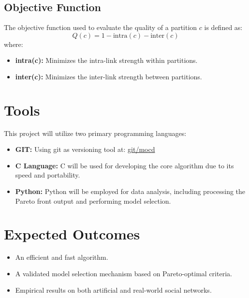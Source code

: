 \documentclass{article}
\begin{document}
\subsection{Objective Function}
The objective function used to evaluate the quality of a partition \( c \) is defined as:
\[
Q(c) = 1 - \text{intra}(c) - \text{inter}(c)
\]
where:
\begin{itemize}
    \item \textbf{intra(c):} Minimizes the intra-link strength within partitions.
    \item \textbf{inter(c):} Minimizes the inter-link strength between partitions.
\end{itemize}

\section{Tools}
This project will utilize two primary programming languages:

\begin{itemize}
    \item \textbf{GIT:} Using git as versioning tool at: \href{https://github.com/0l1ve1r4/mocd}{git/mocd}
    \item \textbf{C Language:} C will be used for developing the core algorithm due to its speed and portability.
    \item \textbf{Python:} Python will be employed for data analysis, including processing the Pareto front output and performing model selection.
\end{itemize}

\section{Expected Outcomes}
\begin{itemize}
    \item An efficient and fast algorithm.
    \item A validated model selection mechanism based on Pareto-optimal criteria.
    \item Empirical results on both artificial and real-world social networks.
\end{itemize}
\end{document}
